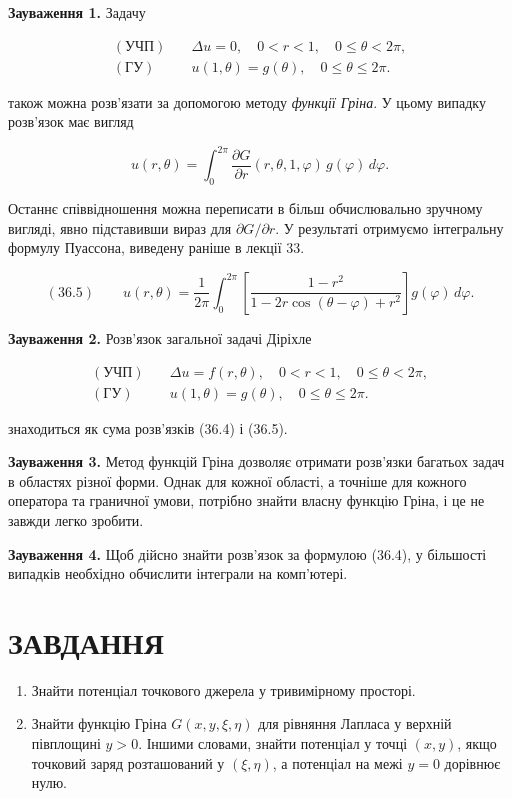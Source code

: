 \documentclass[
  ukrainian,
]{article}
\begin{document}
\textbf{Зауваження 1.} Задачу

\[\begin{aligned}(\text{УЧП}) \quad & \Delta u = 0, \quad 0 < r < 1, \quad 0 \leqslant \theta < 2\pi, \\(\text{ГУ}) \quad & u(1, \theta) = g(\theta), \quad 0 \leqslant \theta \leqslant 2\pi.\end{aligned}\]

також можна розв'язати за допомогою методу \emph{функції Гріна}. У цьому
випадку розв'язок має вигляд

\[u(r, \theta) = \int_{0}^{2\pi} \frac{\partial G}{\partial r}(r, \theta, 1, \varphi)\, g(\varphi)\, d\varphi.\]

Останнє співвідношення можна переписати в більш обчислювально зручному
вигляді, явно підставивши вираз для \(\partial G/\partial r\). У
результаті отримуємо інтегральну формулу Пуассона, виведену раніше в
лекції 33.

\[(36.5)\qquad u(r, \theta) = \frac{1}{2\pi} \int_{0}^{2\pi}\left[ \frac{1 - r^2}{1 - 2r\cos(\theta - \varphi) + r^2} \right] g(\varphi)\, d\varphi.\]

\textbf{Зауваження 2.} Розв'язок загальної задачі Діріхле

\[\begin{aligned}(\text{УЧП}) \quad & \Delta u = f(r, \theta), \quad 0 < r < 1, \quad 0 \le \theta < 2\pi, \\(\text{ГУ}) \quad & u(1, \theta) = g(\theta), \quad 0 \le \theta \le 2\pi.\end{aligned}\]

знаходиться як сума розв'язків (36.4) і (36.5).

\textbf{Зауваження 3.} Метод функцій Гріна дозволяє отримати розв'язки
багатьох задач в областях різної форми. Однак для кожної області, а
точніше для кожного оператора та граничної умови, потрібно знайти власну
функцію Гріна, і це не завжди легко зробити.

\textbf{Зауваження 4.} Щоб дійсно знайти розв'язок за формулою (36.4), у
більшості випадків необхідно обчислити інтеграли на комп'ютері.

\section{ЗАВДАННЯ}\label{ux437ux430ux432ux434ux430ux43dux43dux44f-19}

\begin{enumerate}
\def\labelenumi{\arabic{enumi}.}
\item
  Знайти потенціал точкового джерела у тривимірному просторі.
\item
  Знайти функцію Гріна \(G(x,y,\xi,\eta)\) для рівняння Лапласа у
  верхній півплощині \(y>0\). Іншими словами, знайти потенціал у точці
  \((x,y)\), якщо точковий заряд розташований у \((\xi,\eta)\), а
  потенціал на межі \(y=0\) дорівнює нулю.
\end{enumerate}
\end{document}
